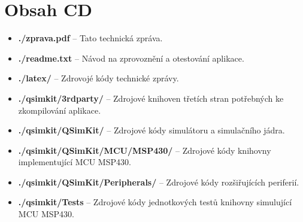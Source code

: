 \chapter{Obsah CD}

\begin{itemize}
\item \textbf{./zprava.pdf} -- Tato technická zpráva.
\item \textbf{./readme.txt} -- Návod na zprovoznění a otestování aplikace.
\item \textbf{./latex/} -- Zdrovojé kódy technické zprávy.
\item \textbf{./qsimkit/3rdparty/} -- Zdrojové knihoven třetích stran potřebných ke zkompilování aplikace.
\item \textbf{./qsimkit/QSimKit/} -- Zdrojové kódy simulátoru a simulačního jádra.
\item \textbf{./qsimkit/QSimKit/MCU/MSP430/} -- Zdrojové kódy knihovny implementující MCU MSP430.
\item \textbf{./qsimkit/QSimKit/Peripherals/} -- Zdrojové kódy rozšiřujících periferií.
\item \textbf{./qsimkit/Tests} -- Zdrojové kódy jednotkových testů knihovny simulující MCU MSP430.
\end{itemize}
